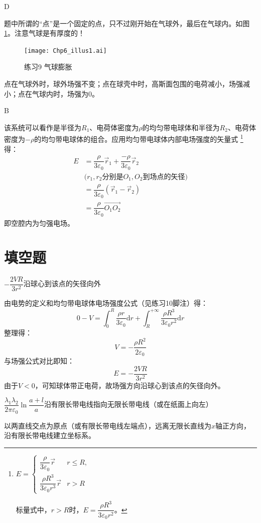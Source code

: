 \documentclass[b5paper,opensource,sourcefont,parskip]{qyxf-book}
\newcommand{\di}[1]{\mathrm{d}#1}
\begin{document}
D

\solve
题中所谓的“点”是一个固定的点，只不过刚开始在气球外，最后在气球内。如图\ref{fig:c6-t9}。注意气球是有厚度的！
\begin{figure}[!htbp]
	\centering
	\texttt{[image: Chp6\_illus1.ai]}
	\caption{练习9 气球膨胀}\label{fig:c6-t9}
\end{figure}
点在气球外时，球外场强不变；点在球壳中时，高斯面包围的电荷减小，场强减小；点在气球内时，场强为0。

B

\solve
该系统可以看作是半径为$R_1$、电荷体密度为$\rho$的均匀带电球体和半径为$R_2$、电荷体密度为$-\rho$的均匀带电球体的组合。应用均匀带电球体内部电场强度的矢量式
\footnote{
	$E=
	\begin{cases}
	\dfrac{\rho}{3\varepsilon_0}\vec{r} & r\leqslant R,\\
	\dfrac{\rho R^3}{3\varepsilon_0 r^3}\vec{r} & r > R
	\end{cases}$
	
	标量式中，$r>R$时，$E=\dfrac{\rho R^3}{3\varepsilon_0 r^2}$。
}得：
\begin{align*}
E&=\dfrac{\rho}{3\varepsilon_0}\vec{r}_1+\dfrac{-\rho}{3\varepsilon_0}\vec{r}_2\\
&\text{($r_1,r_2$分别是$O_1,O_2$到场点的矢径)}\\
&=\dfrac{\rho}{3\varepsilon_0}(\vec{r}_1-\vec{r}_2)\\
&=\dfrac{\rho}{3\varepsilon_0}\overrightarrow{O_1O_2}
\end{align*}
即空腔内为匀强电场。

\section{填空题}

$-\dfrac{2VR}{3r^2}$\quad 沿球心到该点的矢径向外

\solve
由电势的定义和均匀带电球体电场强度公式（见练习10脚注）得：
\[
0-V=\int_{0}^{R}\dfrac{\rho r}{3\varepsilon_0}\di{r}+\int_{R}^{+\infty}\dfrac{\rho R^3}{3\varepsilon_0 r^2}\di{r}
\]
整理得：
\[
V=-\dfrac{\rho R^2}{2\varepsilon_0}
\]
与场强公式对比即知：
\[
E=-\dfrac{2VR}{3r^2}
\]
由于$V<0$，可知球体带正电荷，故场强方向沿球心到该点的矢径向外。

$\dfrac{\lambda_1\lambda_2}{2\pi \varepsilon_0}\ln\dfrac{a+l}{a}$\quad 沿有限长带电线指向无限长带电线（或在纸面上向左）

\solve
以两直线交点为原点（或有限长带电线左端点），远离无限长直线为$x$轴正方向，沿有限长带电线建立坐标系。
\end{document}
